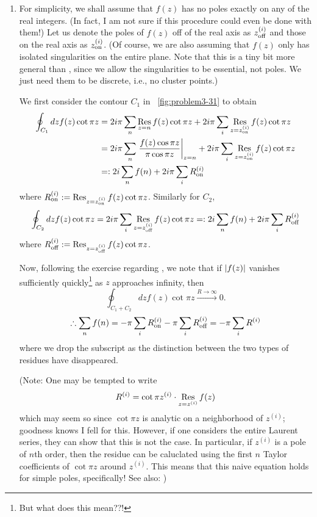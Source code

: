 \begin{enumerate}[wide, labelindent = 0pt, label = (\alph*)]
\item
For simplicity, we shall assume that $f(z)$ has no poles exactly on any of the real integers.
(In fact, I am not sure if this procedure could even be done with them!)
Let us denote the poles of $f(z)$ off of the real axis as $z_{\text{off}}^{\left( i \right)}$
and those on the real axis as $z_{\text{on}}^{\left( i \right)}$.
(Of course, we are also assuming that $f(z)$ only has isolated singularities on the entire plane.
Note that this is a tiny bit more general than
,
since we allow the singularities to be essential, not poles.
We just need them to be discrete, i.e., no cluster points.)

We first consider the contour $C_1$ in ~\ref{fig:problem3-31} to obtain
\begin{align*}
    \oint_{C_1} dz f(z) \cot \pi z
    &= 2i\pi \sum_n \mathop{\mathrm{Res}}_{z=n}{f(z) \cot \pi z} + 2i\pi \sum_i \mathop{\mathrm{Res}}_{z=z_{\text{on}}^{\left( i \right)}}{f(z) \cot \pi z} \\
    &= 2i\pi \sum_n {\left. \frac{f(z) \cos \pi z}{\pi \cos \pi z} \right|}_{z=n}
     + 2i\pi \sum_i \mathop{\mathrm{Res}}_{z=z_{\text{on}}^{\left( i \right)}}{f(z) \cot \pi z} \\
    &=: 2i \sum_n f(n) + 2i\pi \sum_i R_{\text{on}}^{\left( i \right)}
\end{align*}
where $R_{\text{on}}^{\left( i \right)} := \mathop{\mathrm{Res}}_{z=z_{\text{on}}^{\left( i \right)}}{f(z) \cot \pi z}$.
Similarly for $C_2$,
\[
    \oint_{C_2} dz f(z) \cot \pi z
    = 2i\pi \sum_i \mathop{\mathrm{Res}}_{z=z_{\text{off}}^{\left( i \right)}}{f(z) \cot \pi z}
    =: 2i \sum_n f(n) + 2i\pi \sum_i R_{\text{off}}^{\left( i \right)}
\]
where $R_{\text{off}}^{\left( i \right)} := \mathop{\mathrm{Res}}_{z=z_{\text{off}}^{\left( i \right)}}{f(z) \cot \pi z}$.

Now, following the exercise regarding , we note that
if $\left| f(z) \right|$ vanishes sufficiently quickly\footnote{But what does this mean??!} as $z$ approaches infinity,
then
\[
    \oint_{C_1 + C_2} dz f(z) \cot \pi z \xrightarrow{R \rightarrow \infty} 0.
\]
\[
    \therefore \sum_n f(n)
    = -\pi \sum_i R_{\text{on}}^{\left( i \right)} - \pi \sum_i R_{\text{off}}^{\left( i \right)}
    = -\pi \sum_i R^{(i)}
\]
where we drop the subscript as the distinction between the two types of residues have disappeared.

(Note: One may be tempted to write
\[
    R^{(i)} = \cot \pi z^{(i)} \cdot \mathop{\mathrm{Res}}_{z=z^{(i)}}{f(z)}
\]
which may seem so since $\cot \pi z$ is analytic on a neighborhood of $z^{(i)}$;
goodness knows I fell for this.
However, if one considers the entire Laurent series, they can show that this is not the case.
In particular, if $z^{(i)}$ is a pole of $n$th order,
then the residue can be caluclated using the first $n$ Taylor coefficients of $\cot \pi z$ around $z^{(i)}$.
This means that this naive equation holds for simple poles, specifically!
See also: )


\end{enumerate}
